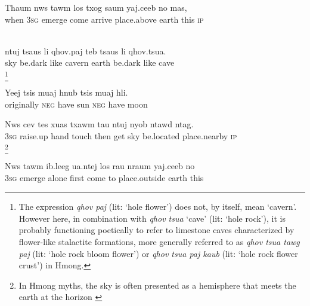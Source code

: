 \documentclass[output=paper]{LSP/langsci}
\begin{document}
 \begin{exe}
\ex \label{JaexApp6}
\gll Thaum nws tawm los txog saum yaj.ceeb no mas,\\
  when 3\textsc{sg} emerge come arrive place.above earth this \textsc{ip}\\
\glt {}\\
\end{exe}


 \begin{exe}
\ex \label{JaexApp7}
\gll ntuj tsaus li qhov.paj teb tsaus li qhov.tsua.\\
     sky be.dark like cavern earth be.dark like cave\\
\glt {}\footnote{The expression \textit{qhov paj} (lit: ‘hole flower’) does not, by itself, mean ‘cavern’. However here, in combination with \textit{qhov tsua} ‘cave’ (lit: ‘hole rock’), it is probably functioning poetically to refer to limestone caves characterized by flower-like stalactite formations, more generally referred to as \textit{qhov tsua tawg paj} (lit: ‘hole rock bloom flower’) or \textit{qhov tsua paj kaub} (lit: ‘hole rock flower crust’) in Hmong.} 
\end{exe} 
 
 \begin{exe}
\ex \label{JaexApp8}
\gll Yeej tsis muaj hnub tsis muaj hli.\\
     originally \textsc{neg} have sun \textsc{neg} have moon\\
\glt {}
\end{exe}

\begin{exe}
\ex \label{JaexApp9}
\gll Nws cev tes xuas txawm tau ntuj nyob ntawd ntag.\\
     3\textsc{sg} raise.up hand touch then get sky be.located place.nearby \textsc{ip}\\
\glt  {}\footnote{In Hmong myths, the sky is often presented as a hemisphere that meets the earth at the horizon \citep[][14, fn.2]{johnson92}}
\end{exe}

\begin{exe}
\ex \label{JaexApp10}
\gll Nws tawm ib.leeg ua.ntej los rau nraum yaj.ceeb no\\
     3\textsc{sg} emerge alone first come to place.outside earth this\\
\glt  {}
\end{exe}
\end{document}
